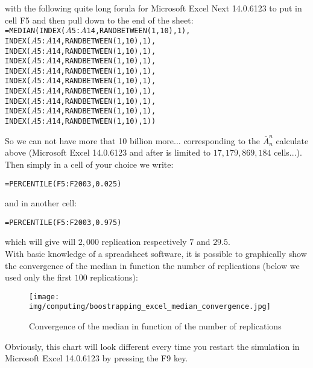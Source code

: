 	\begin{tcolorbox}[colframe=black,colback=white,sharp corners]
	with the following quite long forula for Microsoft Excel Next 14.0.6123 to put in cell F5 and then pull down to the end of the sheet:\\
	
	\texttt{=MEDIAN(INDEX($A$5:$A$14,RANDBETWEEN(1,10),1),\\
INDEX($A$5:$A$14,RANDBETWEEN(1,10),1),\\
INDEX($A$5:$A$14,RANDBETWEEN(1,10),1),\\
INDEX($A$5:$A$14,RANDBETWEEN(1,10),1),\\
INDEX($A$5:$A$14,RANDBETWEEN(1,10),1),\\
INDEX($A$5:$A$14,RANDBETWEEN(1,10),1),\\
INDEX($A$5:$A$14,RANDBETWEEN(1,10),1),\\
INDEX($A$5:$A$14,RANDBETWEEN(1,10),1),\\
INDEX($A$5:$A$14,RANDBETWEEN(1,10),1),\\
INDEX($A$5:$A$14,RANDBETWEEN(1,10),1))
	}
	
	So we can not have more that 10 billion more... corresponding to the $\bar{A}_n^n$ calculate above (Microsoft Excel 14.0.6123 and after is limited  to $17,179,869,184$ cells...).\\
	
	Then simply in a cell of your choice we write:\\
	\begin{center}
	\texttt{=PERCENTILE(F5:F2003,0.025)}
	\end{center}
	and in another cell:\\
	\begin{center}
	\texttt{=PERCENTILE(F5:F2003,0.975)}
	\end{center}
	
	which will give will $2,000$ replication respectively $7$ and $29.5$.\\

	With basic knowledge of a spreadsheet software, it is possible to graphically show the convergence of the median in function the number of replications (below we used only the first $100$ replications):
	\begin{figure}[H]
		\centering
		\texttt{[image: img/computing/boostrapping\_excel\_median\_convergence.jpg]}
		\caption[]{Convergence of the median in function of the number of replications}
	\end{figure}
	Obviously, this chart will look different every time you restart the simulation in Microsoft Excel 14.0.6123 by pressing the F9 key.
	\end{tcolorbox}
	
